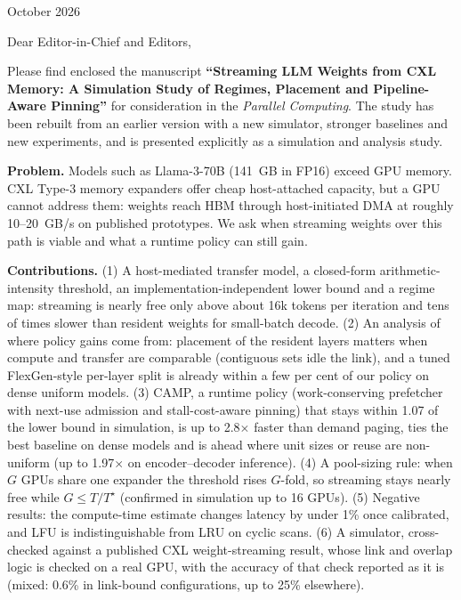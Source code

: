 \documentclass[11pt]{article}
\begin{document}
\begin{flushright}October 2026\end{flushright}

Dear Editor-in-Chief and Editors,

Please find enclosed the manuscript \textbf{``Streaming LLM Weights from CXL Memory: A Simulation Study of Regimes, Placement and Pipeline-Aware Pinning''} for consideration in the \emph{Parallel Computing}. The study has been rebuilt from an earlier version with a new simulator, stronger baselines and new experiments, and is presented explicitly as a simulation and analysis study.

\textbf{Problem.} Models such as Llama-3-70B (141~GB in FP16) exceed GPU memory. CXL Type-3 memory expanders offer cheap host-attached capacity, but a GPU cannot address them: weights reach HBM through host-initiated DMA at roughly 10--20~GB/s on published prototypes. We ask when streaming weights over this path is viable and what a runtime policy can still gain.

\textbf{Contributions.} (1) A host-mediated transfer model, a closed-form arithmetic-intensity threshold, an implementation-independent lower bound and a regime map: streaming is nearly free only above about 16k tokens per iteration and tens of times slower than resident weights for small-batch decode. (2) An analysis of where policy gains come from: placement of the resident layers matters when compute and transfer are comparable (contiguous sets idle the link), and a tuned FlexGen-style per-layer split is already within a few per cent of our policy on dense uniform models. (3) CAMP, a runtime policy (work-conserving prefetcher with next-use admission and stall-cost-aware pinning) that stays within 1.07 of the lower bound in simulation, is up to 2.8$\times$ faster than demand paging, ties the best baseline on dense models and is ahead where unit sizes or reuse are non-uniform (up to 1.97$\times$ on encoder--decoder inference). (4) A pool-sizing rule: when $G$ GPUs share one expander the threshold rises $G$-fold, so streaming stays nearly free while $G\le T/T^\star$ (confirmed in simulation up to 16 GPUs). (5) Negative results: the compute-time estimate changes latency by under 1\% once calibrated, and LFU is indistinguishable from LRU on cyclic scans. (6) A simulator, cross-checked against a published CXL weight-streaming result, whose link and overlap logic is checked on a real GPU, with the accuracy of that check reported as it is (mixed: 0.6\% in link-bound configurations, up to 25\% elsewhere).
\end{document}
